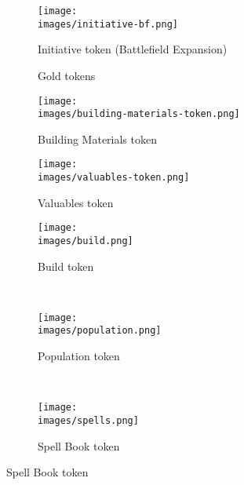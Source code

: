 \begin{figure}[H]
	\centering
	\hspace*{-1em}
	\begin{subfigure}[b]{0.15\linewidth}
		\centering
		\texttt{[image: \\images/initiative-bf.png]}
		\caption{\centering Initiative token (Battlefield Expansion)}
	\end{subfigure}
	\hspace*{-1em}
	\begin{subfigure}[b]{0.2\linewidth}
		\caption{\centering Gold tokens \phantom{Population} \phantom{Population}}
	\end{subfigure}
	\begin{subfigure}[b]{0.11\linewidth}
		\centering
		\texttt{[image: \\images/building-materials-token.png]}
		\caption{\centering Building Materials token}
	\end{subfigure}
	\begin{subfigure}[b]{0.11\linewidth}
		\centering
		\texttt{[image: \\images/valuables-token.png]}
		\caption{\centering Valuables token \phantom{Population}}
	\end{subfigure}
	\begin{subfigure}[b]{0.12\linewidth}
		\texttt{[image: \\images/build.png]}
		\caption{\centering Build token \phantom{Population} \phantom{Population}}
	\end{subfigure}
	~
	\begin{subfigure}[b]{0.12\linewidth}
		\texttt{[image: \\images/population.png]}
		\caption{\centering Population token \phantom{Population}}
	\end{subfigure}
	~
	\begin{subfigure}[b]{0.12\linewidth}
		\texttt{[image: \\images/spells.png]}
		\caption{\centering Spell Book token \phantom{Population}}
	\end{subfigure}
\end{figure}
\vspace*{-3em}
